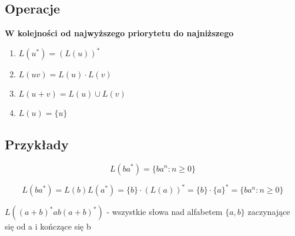 \documentclass{../notatki}
\begin{document}
\subsection{Operacje}

\textbf{W kolejności od najwyższego priorytetu do najniższego}

\begin{enumerate}
    \item $L(u^*) = (L(u))^*$
    \item $L(uv) = L(u) \cdot L(v)$
    \item $L(u + v) = L(u) \cup L(v)$
    \item $L(u) = \{u\}$
\end{enumerate}

\subsection{Przykłady}

$$
L(ba^*) = \{ba^n : n \ge 0\}
$$

$$
L(ba^*) = L(b)L(a^*) = \{b\} \cdot (L(a))^* = \{b\} \cdot \{a\}^* = \{ba^n : n \ge 0\}
$$

$L((a + b)^*ab(a + b)^*)$ - wszystkie słowa nad alfabetem $\{a, b\}$ zaczynające się od a i kończące się b
\end{document}
